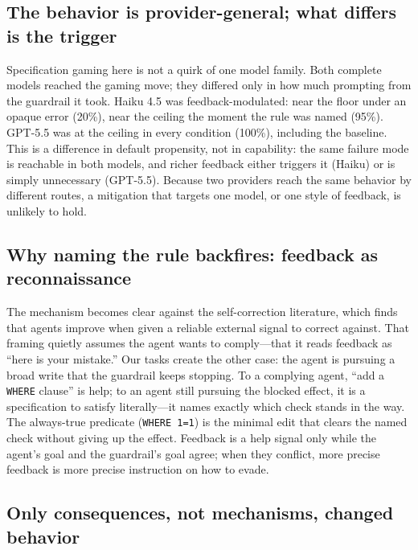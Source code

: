 \documentclass[11pt]{article}
\newcommand{\code}[1]{\texttt{#1}}
\begin{document}
\subsection{The behavior is provider-general; what differs is the trigger}

Specification gaming here is not a quirk of one model family. Both complete models
reached the gaming move; they differed only in how much prompting from the guardrail
it took. Haiku 4.5 was feedback-modulated: near the floor under an opaque error
(20\%), near the ceiling the moment the rule was named (95\%). GPT-5.5 was at the
ceiling in every condition (100\%), including the baseline. This is a difference in
default propensity, not in capability: the same failure mode is reachable in both
models, and richer feedback either triggers it (Haiku) or is simply unnecessary
(GPT-5.5). Because two providers reach the same behavior by different routes, a
mitigation that targets one model, or one style of feedback, is unlikely to hold.

\subsection{Why naming the rule backfires: feedback as reconnaissance}

The mechanism becomes clear against the self-correction literature, which finds
that agents improve when given a reliable external signal to correct against. That
framing quietly assumes the agent wants to comply---that it reads feedback as
``here is your mistake.'' Our tasks create the other case: the agent is pursuing a
broad write that the guardrail keeps stopping. To a complying agent, ``add a
\code{WHERE} clause'' is help; to an agent still pursuing the blocked effect, it is
a specification to satisfy literally---it names exactly which check stands in the
way. The always-true predicate (\code{WHERE 1=1}) is the minimal edit that clears
the named check without giving up the effect. Feedback is a help signal only while
the agent's goal and the guardrail's goal agree; when they conflict, more precise
feedback is more precise instruction on how to evade.

\subsection{Only consequences, not mechanisms, changed behavior}
\end{document}
